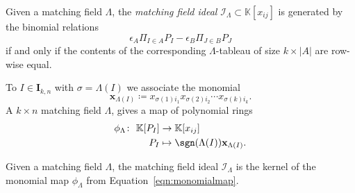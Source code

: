 \begin{Definition}
Given a matching field $\Lambda$, the \emph{matching field ideal} $\mathcal{I}_{\Lambda} \subset \mathbb{K}[x_{ij}]$ is generated by the 
 binomial relations 
\begin{equation}\label{eq:binomials}
\epsilon_A \Pi_{I \in A} P_I - \epsilon_B \Pi_{J \in B} P_J
\end{equation}
if and only if the contents of the corresponding $\Lambda$-tableau of size $k \times |A|$ are row-wise equal.
\end{Definition}

To $I \in \mathbf{I}_{k, n}$ {with $\sigma=\Lambda(I)$} we associate the monomial 
\[ 
\mathbf{x}_{\Lambda(I)}\coloneqq x_{\sigma(1) i_{1}}x_{\sigma(2)i_2}\cdots x_{{\sigma(k)i_k}}. 
 \]
A $k\times n$ matching field $\Lambda$, 
gives a map of polynomial rings 
\begin{equation}\label{eqn:monomialmap}
\begin{aligned}
\phi_{\Lambda} \colon\ \mathbb{K}[P_I] &\rightarrow \mathbb{K}[x_{ij}] 
\\ 
 P_{I} &\mapsto \sgn(\Lambda(I)) \mathbf{x}_{\Lambda(I)}.
\end{aligned}
\end{equation}

\smallskip



\begin{Proposition}
Given a matching field $\Lambda$, the matching field ideal $\mathcal{I}_{\Lambda}$ is the kernel of the monomial map
$\phi_{\Lambda}$ from Equation~\eqref{eqn:monomialmap}. 
\end{Proposition}


